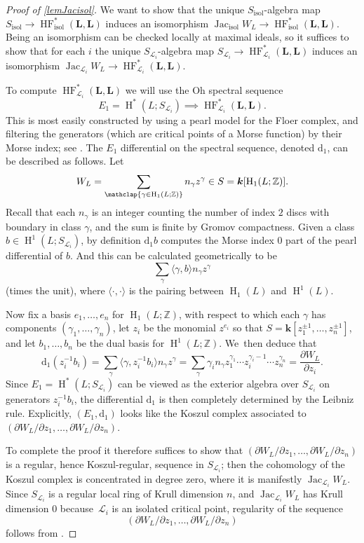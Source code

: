 \documentclass[JEP,XML,SOM,Unicode,NoEqCountersInSection,NoFloatCountersInSection,published]{cedram}
\theoremstyle{definition}
\newcommand{\ZZ}{\mathbb{Z}}
\newcommand{\calL}{\mathcal{L}}
\newcommand{\kk}{{\boldsymbol{k}}}
\newcommand{\bL}{{\boldsymbol{L}}}
\newcommand{\diff}{\mathrm{d}}
\newcommand{\isol}{\mathrm{isol}}
\newcommand{\rH}{\operatorname{H}}
\newcommand{\HF}{\operatorname{HF}}
\newcommand{\Jac}{\operatorname{Jac}}
\newcommand{\Jacisol}{\operatorname{Jac}_\isol}
\begin{document}
\begin{proof}[Proof of \cref{lemJacisol}]
We want to show that the unique $S_\isol$-algebra map $S_\isol \to \HF^*_\isol(\bL, \bL)$ induces an isomorphism $\Jacisol W_L \to \HF^*_\isol(\bL, \bL)$. Being an isomorphism can be checked locally at maximal ideals, so it suffices to show that for each $i$ the unique $S_{\calL_i}$-algebra map $S_{\calL_i} \to \HF^*_{\calL_i}(\bL, \bL)$ induces an isomorphism $\Jac_{\calL_i} W_L \to \HF^*_{\calL_i}(\bL, \bL)$.

To compute $\HF_{\calL_i}^*(\bL, \bL)$ we will use the Oh spectral sequence \cite{OhSS}
\[
E_1 = \rH^*(L; S_{\calL_i}) \implies \HF_{\calL_i}^*(\bL, \bL).
\]
This is most easily constructed by using a pearl model for the Floer complex, and filtering the generators (which are critical points of a Morse function) by their Morse index; see \cite{biran2007quantum}. The $E_1$ differential on the spectral sequence, denoted $\diff_1$, can be described as follows. Let
\[
W_L = \sum_{\mathclap{\gamma \in \rH_1(L; \ZZ)}} n_\gamma z^\gamma \in S = \kk[\rH_1(L; \ZZ)].
\]
Recall that each $n_\gamma$ is an integer counting the number of index $2$ discs with boundary in class $\gamma$, and the sum is finite by Gromov compactness. Given a class $b \in \rH^1(L; S_{\calL_i})$, by definition $\diff_1 b$ computes the Morse index $0$ part of the pearl differential of $b$. And this can be calculated geometrically to be
\[
\sum_{\gamma} \langle \gamma, b \rangle n_\gamma z^{\gamma}
\]
(times the unit), where $\langle \cdot, \cdot \rangle$ is the pairing between $\rH_1(L)$ and $\rH^1(L)$.

Now fix a basis $e_1, \dots, e_n$ for $\rH_1(L; \ZZ)$, with respect to which each $\gamma$ has components $(\gamma_1, \dots, \gamma_n)$, let $z_i$ be the monomial $z^{e_i}$ so that $S = \kk[z_1^{\pm1}, \dots, z_n^{\pm1}]$, and let $b_1, \dots, b_n$ be the dual basis for $\rH^1(L; \ZZ)$. We~then deduce that\vspace*{-3pt}
\[
\diff_1 (z_i^{-1}b_i) = \sum_\gamma \langle \gamma, z_i^{-1}b_i \rangle n_\gamma z^\gamma = \sum_\gamma \gamma_i n_\gamma z_1^{\gamma_1} \cdots z_i^{\gamma_i - 1} \cdots z_n^{\gamma_n} = \frac{\partial W_L}{\partial z_i}.
\]
Since $E_1 = \rH^*(L; S_{\calL_i})$ can be viewed as the exterior algebra over $S_{\calL_i}$ on generators $z_i^{-1}b_i$, the differential $\diff_1$ is then completely determined by the Leibniz rule. Explicitly, $(E_1, \diff_1)$ looks like the Koszul complex associated to $(\partial W_L / \partial z_1, \dots, \partial W_L / \partial z_n)$.

To complete the proof it therefore suffices to show that $(\partial W_L / \partial z_1, \dots, \partial W_L / \partial z_n)$ is a regular, hence Koszul-regular, sequence in $S_{\calL_i}$; then the cohomology of the Koszul complex is concentrated in degree zero, where it is manifestly $\Jac_{\calL_i} W_L$. Since $S_{\calL_i}$ is a regular local ring of Krull dimension $n$, and $\Jac_{\calL_i} W_L$ has Krull dimension $0$ because~$\calL_i$ is an isolated critical point, regularity of the sequence\vspace*{-3pt}
\[
(\partial W_L / \partial z_1, \dots, \partial W_L / \partial z_n)
\]
follows from \cite[Exer.\,26.2.D]{VakilAG}.
\end{proof}
\end{document}
